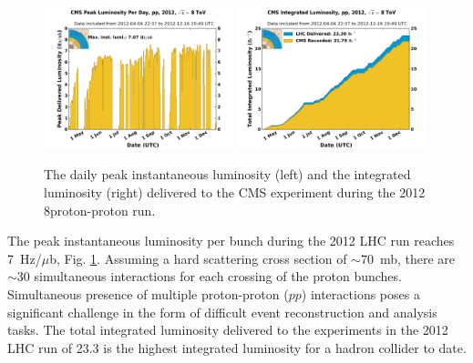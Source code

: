 \begin{figure}[htbp]
\centering
\includegraphics[width=0.49\textwidth]{plots/intro/peak_lumi.pdf}
\includegraphics[width=0.49\textwidth]{plots/intro/int_lumi.pdf}
\caption{The daily peak instantaneous luminosity (left) and the integrated luminosity (right)
 delivered to the CMS experiment during the 2012 8\TeV proton-proton run.\label{fig:lumi}}
\end{figure}

The peak instantaneous luminosity per bunch during the 2012 LHC run 
 reaches 7~Hz/$\mu$b, Fig. \ref{fig:lumi}. 
Assuming a hard scattering cross section of $\sim70$~mb, there are $\sim$30 simultaneous interactions 
for each 
crossing of the proton bunches. Simultaneous presence of multiple proton-proton ($pp$) interactions
 poses a significant challenge in the form of difficult event reconstruction and analysis tasks.
 The total integrated luminosity 
delivered to the experiments in the 2012 LHC run of 23.3 \fbinv 
is the highest integrated luminosity for a hadron collider 
to date.
